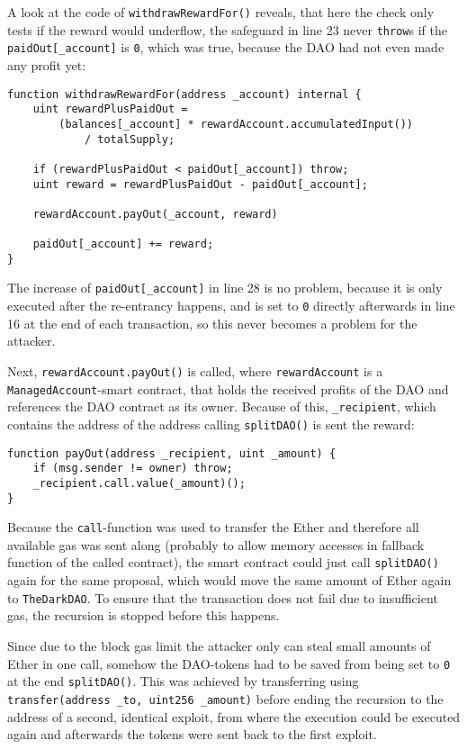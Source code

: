 A look at the code of \texttt{withdrawRewardFor()} reveals, that here the check only tests if the reward would underflow, the safeguard in line 23 never \texttt{throw}s if the \texttt{paidOut[_account]} is \texttt{0}, which was true, because the DAO had not even made any profit yet:
\begin{verbatim}
function withdrawRewardFor(address _account) internal {
    uint rewardPlusPaidOut =
        (balances[_account] * rewardAccount.accumulatedInput())
            / totalSupply;

    if (rewardPlusPaidOut < paidOut[_account]) throw;
    uint reward = rewardPlusPaidOut - paidOut[_account];

    rewardAccount.payOut(_account, reward)

    paidOut[_account] += reward;
}
\end{verbatim}

The increase of \texttt{paidOut[_account]} in line 28 is no problem, because it is only executed after the re-entrancy happens, and is set to \texttt{0} directly afterwards in line 16 at the end of each transaction, so this never becomes a problem for the attacker.

Next, \texttt{rewardAccount.payOut()} is called, where \texttt{rewardAccount} is a \texttt{ManagedAccount}-smart contract, that holds the received profits of the DAO and references the DAO contract as its owner. Because of this, \texttt{_recipient}, which contains the address of the address calling \texttt{splitDAO()} is sent the reward:
\begin{verbatim}
function payOut(address _recipient, uint _amount) {
    if (msg.sender != owner) throw;
    _recipient.call.value(_amount)();
}
\end{verbatim}

Because the \texttt{call}-function was used to transfer the Ether and therefore all available gas was sent along (probably to allow memory accesses in fallback function of the called contract), the smart contract could just call \texttt{splitDAO()} again for the same proposal, which would move the same amount of Ether again to \texttt{TheDarkDAO}. To ensure that the transaction does not fail due to insufficient gas, the recursion is stopped before this happens.

Since due to the block gas limit the attacker only can steal small amounts of Ether in one call, somehow the DAO-tokens had to be saved from being set to \texttt{0} at the end \texttt{splitDAO()}. This was achieved by transferring using \texttt{transfer(address _to, uint256 _amount)} before ending the recursion to the address of a second, identical exploit, from where the execution could be executed again and afterwards the tokens were sent back to the first exploit.

